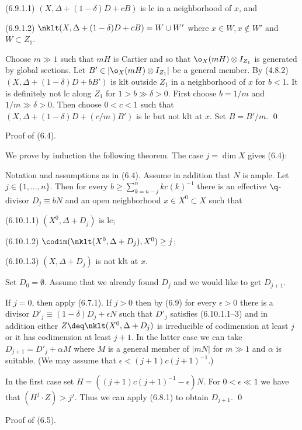 (6.9.1.1) $(X,\Delta+(1-\delta)D+  cB)$ is
lc in a neighborhood of $x$, and

(6.9.1.2) 
$\nklt(X,\Delta+(1-\delta)D+  cB)=W\cup W'$ where $x\in W, x\not\in W'$ and
$W\subset Z_1$.
\endproclaim

\demop  Choose $m\gg 1$  such that $mH$ is Cartier and so that $\o_X(mH)\otimes
I_{Z_1}$ is generated by global sections. Let $B'\in |\o_X(mH)\otimes I_{Z_1}|$
be a general member. By (4.8.2)
$(X,\Delta+(1-\delta)D+b B')$ is klt outside
$Z_1$ in a neighborhood of $x$ for $b< 1$. It is definitely not lc  along
$Z_1$ for $1>b\gg \delta>0$. 
First choose
$b= 1/m$ and $1/m\gg \delta>0$. Then choose $0<c<1$ such that
$(X,\Delta+(1-\delta)D+(c/m) B')$ is lc but not   klt at $x$. Set
$B=B'/m$. \qed\enddemo
\enddemo

 Proof of (6.4).

We prove by induction the following theorem. The case $j=\dim X$ gives
(6.4):

 Notation and assumptions as in (6.4). Assume in
addition that $N$ is ample.  Let $j\in \{1,\dots,n\}$. 
Then for every $b\geq \sum_{k=n-j}^nkc(k)^{-1}$ there is an effective
$\q$-divisor
$D_j\equiv bN$ and an open neighborhood $x\in X^0\subset X$ such that

(6.10.1.1) $(X^0,\Delta+D_j)$ is lc;

(6.10.1.2) $\codim(\nklt(X^0,\Delta+D_j), X^0)\geq j$;

(6.10.1.3) $(X,\Delta+D_j)$ is not klt at $x$.
\endproclaim

\demop Set $D_0=\emptyset$.  Assume that we already
found  $D_j$ and we would like to get $D_{j+1}$. 

If $j=0$, then apply (6.7.1).  If $j>0$ then 
by (6.9) for every $\epsilon>0$ there is a divisor $D'_j\equiv
(1-\delta)D_j+\epsilon N$ such that $D'_j$ satisfies (6.10.1.1--3)
and in addition either $Z\deq \nklt(X^0,\Delta+D_j)$ is irreducible of
codimension at least $j$ or it has codimension at least $j+1$. In the latter
case we can take $D_{j+1}=D'_j+\alpha M$ where $M$ is a general member of
$|mN|$ for $m\gg 1$ and $\alpha$ is suitable. (We may assume that
$\epsilon<(j+1)c(j+1)^{-1}$.)

In the first case set 
$H=((j+1)c(j+1)^{-1}-\epsilon)N$. For $0<\epsilon\ll 1$ we have that
$(H^j\cdot Z)>j^j$. Thus we can apply  (6.8.1) to obtain $D_{j+1}$. 
\qed\enddemo


\enddemo

 Proof of (6.5).

